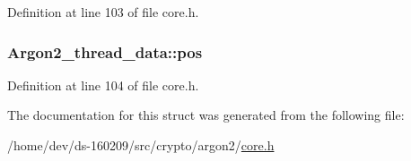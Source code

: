 Definition at line 103 of file core.\+h.

\hypertarget{struct_argon2__thread__data_a4f4c0a70218ac7ac50497b0abb33d439}{}
\subsubsection[{pos}]{ Argon2\+\_\+thread\+\_\+data\+::pos}\label{struct_argon2__thread__data_a4f4c0a70218ac7ac50497b0abb33d439}


Definition at line 104 of file core.\+h.



The documentation for this struct was generated from the following file\+:\begin{DoxyCompactItemize}
\item 
/home/dev/ds-\/160209/src/crypto/argon2/\hyperlink{core_8h}{core.\+h}\end{DoxyCompactItemize}
